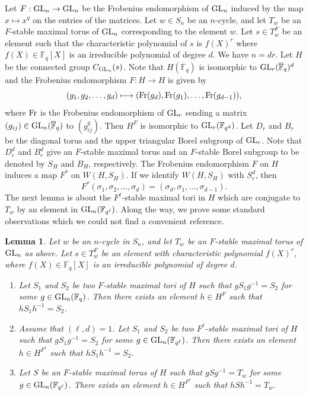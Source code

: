\documentclass[10pt, reqno]{amsart}
\theoremstyle{plain}
\numberwithin{equation}{section} \newcommand{\di}{\operatorname{dim}}
\newtheorem{lemma}[theorem]{Lemma}
\begin{document}
\subsubsection{}
Let $F:{\rm GL}_n\rightarrow {\rm GL}_n$ be the Frobenius endomorphism
of ${\rm GL}_n$ induced by the map $x\mapsto x^q$ on the entries of
the matrices. Let $w\in S_n$ be an $n$-cycle, and let $T_w$ be an
$F$-stable maximal torus of ${\rm GL}_n$ corresponding to the element
$w$. Let $s\in T_w^F$ be an element such that the characteristic
polynomial of $s$ is $f(X)^r$ where $f(X)\in \mathbb{F}_q[X]$ is an
irreducible polynomial of degree $d$. We have $n=dr$. Let $H$ be the
connected group $C_{{\rm GL}_n}(s)$.  Note that
$H(\overline{\mathbb{F}}_q)$ is isomorphic to
${\rm GL}_r(\overline{\mathbb{F}}_q)^d$ and the Frobenius endomorphism
$F:H\rightarrow H$ is given by
$$(g_1,g_2,\dots, g_d)\longmapsto ({\rm Fr}(g_d), {\rm Fr}(g_1),\dots,
{\rm Fr}(g_{d-1})),$$
where ${\rm Fr}$ is the Frobenius endomorphism of ${\rm GL}_r$
sending a matrix $(g_{ij})\in {\rm GL}_n(\overline{\mathbb{F}}_q)$
to $(g_{ij}^{q})$. Then $H^F$ is
isomorphic to ${\rm GL}_r(\mathbb{F}_{q^d})$. Let $D_r$ and $B_r$ be
the diagonal torus and the upper triangular Borel subgroup of
${\rm GL}_r$. Note that $D_r^d$ and $B_r^d$ give an $F$-stable maximal
torus and an $F$-stable Borel subgroup to be denoted by $S_H$ and
$B_H$, respectively. The Frobenius endomorphism $F$ on $H$ induces a
map $F^\ast$ on $W(H, S_H)$. If we identify $W(H, S_H)$ with
$S_{r}^d$, then
$$F^\ast(\sigma_1,\sigma_2,\dots, \sigma_d)=(\sigma_d, \sigma_1,\dots,
\sigma_{d-1}).$$
The next lemma is about the $F^\ell$-stable maximal tori in $H$ which are
conjugate to $T_w$ by an element in ${\rm
GL}_n(\mathbb{F}_{q^\ell})$. Along the way, we prove some standard
observations which we could not find a convenient reference.
\begin{lemma}\label{Conjugacy_maximal_torus}
Let $w$ be an $n$-cycle in $S_n$, and let $T_w$ be an $F$-stable
maximal torus of ${\rm GL}_n$ as above.
Let $s\in T_w^F$ be an element with
characteristic polynomial $f(X)^r$, where $f(X)\in \mathbb{F}_q[X]$
is an irreducible polynomial of degree $d$. 
\begin{enumerate}
\item Let $S_1$ and $S_2$ be two $F$-stable maximal tori of $H$ such that
$gS_1g^{-1}=S_2$ for some $g\in {\rm GL}_n(\mathbb{F}_q)$. Then
there exists an element $h\in H^F$ such that $hS_1h^{-1}=S_2$. 
\item Assume that $(\ell, d)=1$. Let $S_1$ and $S_2$ be two $F^\ell$-stable
maximal tori of $H$ such that $gS_1g^{-1}=S_2$ for some
$g\in {\rm GL}_n(\mathbb{F}_{q^\ell})$. Then there exists an element
$h\in H^{F^\ell}$ such that $hS_1h^{-1}=S_2$.
\item Let $S$ be an $F$-stable maximal
torus of $H$ such that $gSg^{-1}=T_w$ for some $g\in {\rm
GL}_n(\mathbb{F}_{q^\ell})$. There exists an element $h\in H^{F^\ell}$ such
that $hSh^{-1}=T_w$. 
\end{enumerate}
\end{lemma}
\end{document}
